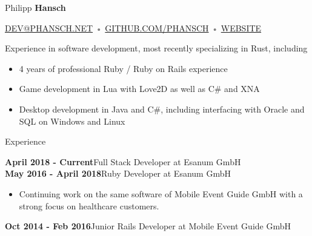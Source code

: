 \documentclass[12pt]{article}
\begin{document}
\thispagestyle{empty}



{\Huge Philipp \textbf{Hansch}}

{\footnotesize
  \textcolor{Gray}{
    \href{mailto:dev@phansch.net}{\uppercase{dev@phansch.net}}
    •
    \href{http://github.com/phansch}{\uppercase{github.com/phansch}}
    •
    \href{http://phansch.net}{\uppercase{Website}}
  }
}

\vspace{0.5cm}

Experience in software development, most recently specializing in Rust, including

\begin{itemize}
  \setlength{\itemsep}{0cm}
  \setlength{\parskip}{0cm}
  \item 4 years of professional Ruby / Ruby on Rails experience
  \item Game development in Lua with Love2D as well as C\# and XNA
  \item Desktop development in Java and C\#, including interfacing with Oracle and SQL on Windows and Linux
\end{itemize}

{\Large Experience}

\textbf{April 2018 - Current}\hfill Full Stack Developer at Esanum GmbH
\\

\textbf{May 2016 - April 2018}\hfill Ruby Developer at Esanum GmbH

\begin{itemize}
  \setlength{\itemsep}{0cm}
  \setlength{\parskip}{0cm}

  \item Continuing work on the same software of Mobile Event Guide GmbH with a strong focus on healthcare customers.
\end{itemize}

\textbf{Oct 2014 - Feb 2016}\hfill Junior Rails Developer at Mobile Event Guide GmbH
\end{document}
